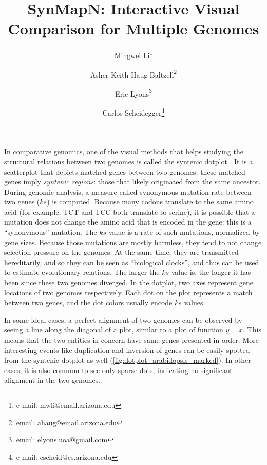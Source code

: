 \documentclass{vgtc}                      %
\title{SynMapN: Interactive Visual Comparison for Multiple Genomes}
\author{
Mingwei Li\thanks{e-mail: mwli@email.arizona.edu}
\and Asher Keith Haug-Baltzell\thanks{email: ahaug@email.arizona.edu}
\and Eric Lyons\thanks{email: elyons.uoa@gmail.com}
\and Carlos Scheidegger\thanks{e-mail: cscheid@cs.arizona.edu}
}
\affiliation{\scriptsize University of Arizona}
\begin{document}
\maketitle
In comparative genomics, one of the visual methods that helps studying the structural relations between two genomes is called the syntenic dotplot \cite{syntenic_dotplot, synmap}.
It is a scatterplot that depicts matched genes between two genomes; these matched genes imply \emph{syntenic regions}: those that likely originated from the same ancestor.
During genomic analysis, a measure called synonymous mutation rate between two genes ($ks$) is computed.
Because many codons translate to the same amino acid (for example, TCT and TCC both translate to serine), it is possible that a mutation does not change the amino acid that is encoded in the gene: this is a ``synonymous'' mutation.
The $ks$ value is a rate of such mutations, normalized by gene sizes. Because those mutations are mostly harmless, they tend to not change selection pressure on the genomes. At the same time, they are transmitted hereditarily, and so they can be seen as ``biological clocks'', and thus can be used to estimate evolutionary relations.
The larger the $ks$ value is, the longer it has been since these two genomes diverged.
In the dotplot, two axes represent gene locations of two genomes respectively. Each dot on the plot represents a match between two genes, and the dot colors usually encode $ks$ values.

In some ideal cases, a perfect alignment of two genomes can be observed by seeing a line along the diagonal of a plot, similar to a plot of function $y=x$. This means that the two entities in concern have same genes presented in order. More interesting events like duplication and inversion of genes can be easily spotted from the syntenic dotplot as well (\autoref{fig:dotplot_arabidopsis_marked}). In other cases, it is also common to see only sparse dots, indicating no significant alignment in the two genomes.
\end{document}
